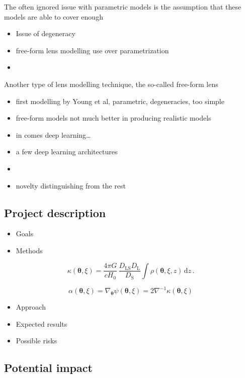 \documentclass[a4paper,10pt]{article}
\begin{document}
The often ignored issue with parametric models is the assumption that
these models are able to cover enough 

\begin{itemize}
\item Issue of degeneracy

\item free-form lens modelling use over parametrization

\item 
\end{itemize}

Another type of lens modelling technique, the so-called
free-form lens 




\begin{itemize}
\item first modelling by Young et al, parametric, degeneracies, too simple
\item free-form models not much better in producing realistic models
\end{itemize}

\begin{itemize}
\item in comes deep learning\ldots{}
\item a few deep learning architectures
\item 
\end{itemize}


\begin{itemize}
\item novelty distinguishing from the rest
\end{itemize}

\subsection*{Project description}
\label{sec:orgbf86ea5}

\begin{itemize}
\item Goals

\item Methods
\end{itemize}

\begin{equation}
\label{eq:thinlens}
  \kappa(\bm\theta,\xi) = \frac{4\pi G}{cH_0}\, \frac{D_\mathrm{LS}D_\mathrm{L}}{D_\mathrm{S}} \int \rho(\bm\theta,\xi,z)\,\mathrm{d}z \,.
\end{equation}

\begin{equation}
  \alpha(\bm\theta,\xi) = \nabla_{\bm\theta}\psi(\bm\theta,\xi) = 2\nabla^{-1}\kappa(\bm\theta,\xi)
\end{equation}


\begin{itemize}
\item Approach
\item Expected results
\item Possible risks
\end{itemize}


\subsection*{Potential impact}
\label{sec:org9a00517}





\end{document}
